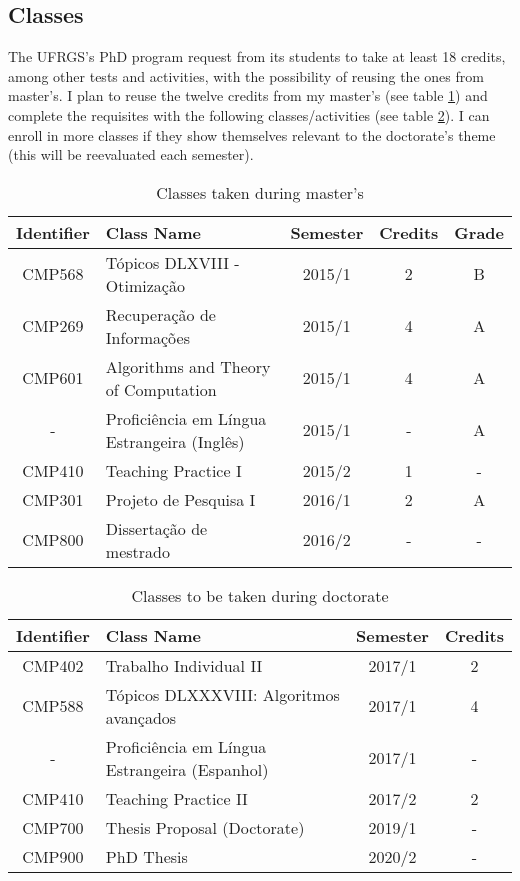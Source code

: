 \documentclass[english,plano-doutorado,twoside]{iiufrgs}
\begin{document}
\subsection{Classes}\label{disciplinas}

The UFRGS's PhD program request from its students to take at least 18 credits, among other tests and activities, with the possibility of reusing the ones from master's. I plan to reuse the twelve credits from my master's (see table \ref{tab:AtividadesDot1}) and complete the requisites with the following classes/activities (see table \ref{tab:AtividadesDot2}). I can enroll in more classes if they show themselves relevant to the doctorate's theme (this will be reevaluated each semester).

\begin{table}[H]
	\centering
	\normalsize
	\caption{Classes taken during master's} \medskip
	\begin{tabular}{|c|l|c|c|c|}
	\hline
        Identifier & Class Name & Semester & Credits & Grade\\
	\hline\hline
        CMP568 & Tópicos DLXVIII - Otimização & 2015/1 & 2 & B \\
        CMP269 & Recuperação de Informações & 2015/1 & 4 & A \\
        CMP601 & Algorithms and Theory of Computation & 2015/1 & 4 & A \\
	- & Proficiência em Língua Estrangeira (Inglês) & 2015/1 & - & A \\
	CMP410 & Teaching Practice I & 2015/2 & 1 & - \\
        CMP301 & Projeto de Pesquisa I & 2016/1 & 2 & A \\
        CMP800 & Dissertação de mestrado & 2016/2 & - & - \\
	\hline
	\end{tabular}
	\label{tab:AtividadesDot1}
\end{table}

\begin{table}[H]
	\centering
	\caption{Classes to be taken during doctorate} \medskip
	\begin{tabular}{|c|l|c|c|}
	\hline
        Identifier & Class Name & Semester & Credits\\
	\hline\hline
        CMP402 & Trabalho Individual II & 2017/1 & 2 \\
	CMP588 & Tópicos DLXXXVIII: Algoritmos avançados & 2017/1 & 4 \\
	- & Proficiência em Língua Estrangeira (Espanhol) & 2017/1 & - \\
        CMP410 & Teaching Practice II & 2017/2 & 2 \\        
        CMP700 & Thesis Proposal (Doctorate) & 2019/1 & - \\              
        CMP900 & PhD Thesis & 2020/2 & - \\
	\hline
	\end{tabular}
	\label{tab:AtividadesDot2}
\end{table}
\end{document}
